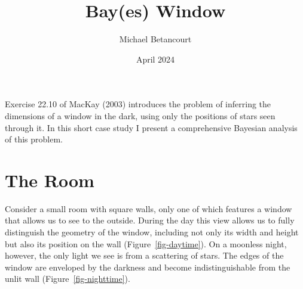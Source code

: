 \documentclass[
  letterpaper,
  DIV=11,
  numbers=noendperiod]{scrartcl}
\title{Bay(es) Window}
\author{Michael Betancourt}
\date{April 2024}
\renewcommand*\contentsname{Table of contents}
\newcommand\contentsname{Table of contents}
\begin{document}
\maketitle

\renewcommand*\contentsname{Table of contents}
{
\hypersetup{linkcolor=}
\setcounter{tocdepth}{3}
\tableofcontents
}
Exercise 22.10 of MacKay (2003) introduces the problem of inferring the
dimensions of a window in the dark, using only the positions of stars
seen through it. In this short case study I present a comprehensive
Bayesian analysis of this problem.

\section{The Room}\label{the-room}

Consider a small room with square walls, only one of which features a
window that allows us to see to the outside. During the day this view
allows us to fully distinguish the geometry of the window, including not
only its width and height but also its position on the wall
(Figure~\ref{fig-daytime}). On a moonless night, however, the only light
we see is from a scattering of stars. The edges of the window are
enveloped by the darkness and become indistinguishable from the unlit
wall (Figure~\ref{fig-nighttime}).
\end{document}
